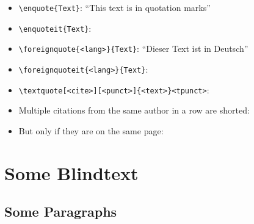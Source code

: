 \begin{itemize}
	\item \lstinline[language={[LaTeX]TeX}]!\enquote{Text}!: \enquote{This text is in quotation marks}
	\item \lstinline[language={[LaTeX]TeX}]!\enquoteit{Text}!: 
	\item \lstinline[language={[LaTeX]TeX}]!\foreignquote{<lang>}{Text}!: \foreignquote{ngerman}{Dieser Text ist in Deutsch}
	\item \lstinline[language={[LaTeX]TeX}]!\foreignquoteit{<lang>}{Text}!: 
	\item \lstinline[language={[LaTeX]TeX}]!\textquote[<cite>][<punct>]{<text>}<tpunct>!: 
	\item Multiple citations from the same author in a row are shorted: \cite[see][3]{Robertson2013}
	\item But only if they are on the same page: \cite[see][3]{Robertson2013}
\end{itemize}


\chapter{Some Blindtext}
\label{cha:SomeBlindtext}

\blindtext

\section{Some Paragraphs}
\label{sec:SomeParagraphs}

\Blindtext